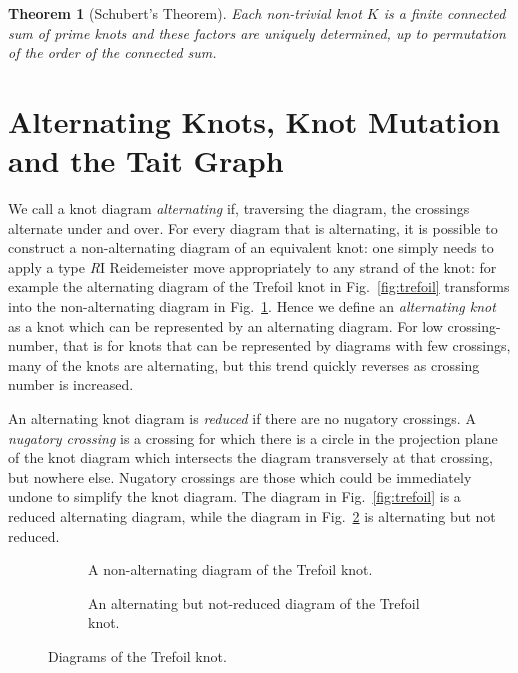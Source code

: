 \documentclass[12pt]{report}
\newtheorem*{theorem}{Theorem}
\begin{document}
\begin{theorem}[Schubert's Theorem]
	Each non-trivial knot $K$ is a finite connected sum of prime knots and these factors are uniquely determined, up to permutation of the order of the connected sum. 
\end{theorem}

\section{Alternating Knots, Knot Mutation and the Tait Graph}
We call a knot diagram \textit{alternating} if, traversing the diagram, the crossings alternate under and over. For every diagram that is alternating, it is possible to construct a non-alternating diagram of an equivalent knot: one simply needs to apply a type \textit{R}I Reidemeister move appropriately to any strand of the knot: for example the alternating diagram of the Trefoil knot in Fig.~\ref{fig:trefoil} transforms into the non-alternating diagram in Fig.~\ref{fig:trefoil-nonalternating}. Hence we define an \textit{alternating knot} as a knot which can be represented by an alternating diagram. For low crossing-number, that is for knots that can be represented by diagrams with few crossings, many of the knots are alternating, but this trend quickly reverses as crossing number is increased.

An alternating knot diagram is \textit{reduced} if there are no nugatory crossings. A \textit{nugatory crossing} is a crossing for which there is a circle in the projection plane of the knot diagram which intersects the diagram transversely at that crossing, but nowhere else. Nugatory crossings are those which could be immediately undone to simplify the knot diagram. The diagram in Fig.~\ref{fig:trefoil} is a reduced alternating diagram, while the diagram in Fig.~\ref{fig:trefoil-nugatory} is alternating but not reduced.


\begin{figure}[hbt!]
	\centering
	\hspace*{\fill}
	\begin{subfigure}[b]{0.4 \textwidth}
		\centering
		\def\svgscale{0.23}
		
		\caption{A non-alternating diagram of the Trefoil knot.}
		\label{fig:trefoil-nonalternating}
	\end{subfigure}
	\hspace*{\fill} \hspace*{\fill}	\hspace*{\fill}
	\begin{subfigure}[b]{0.4 \textwidth}
		\centering
		\def\svgscale{0.23}
		
		\caption{An alternating but not-reduced diagram of the Trefoil knot.}
		\label{fig:trefoil-nugatory}
	\end{subfigure}
	\hspace*{\fill} 
	\caption{Diagrams of the Trefoil knot.}
	\label{fig:trefoil-diagrams}
\end{figure}
\end{document}
